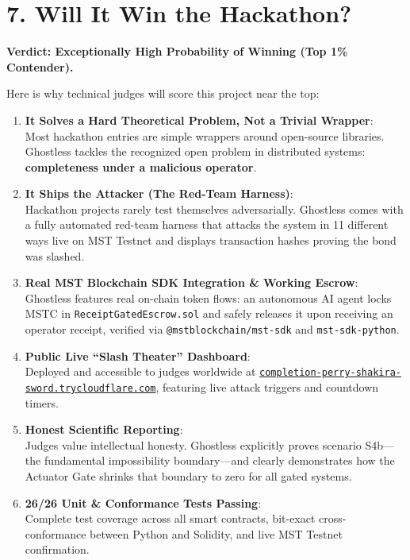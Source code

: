 \documentclass[11pt,a4paper]{article}
\begin{document}
\section{7. Will It Win the Hackathon?}

\textbf{Verdict: Exceptionally High Probability of Winning (Top 1\% Contender).}

Here is why technical judges will score this project near the top:

\begin{enumerate}[leftmargin=1.5em]
    \item \textbf{It Solves a Hard Theoretical Problem, Not a Trivial Wrapper}:\\
    Most hackathon entries are simple wrappers around open-source libraries. Ghostless tackles the recognized open problem in distributed systems: \textbf{completeness under a malicious operator}.
    \item \textbf{It Ships the Attacker (The Red-Team Harness)}:\\
    Hackathon projects rarely test themselves adversarially. Ghostless comes with a fully automated red-team harness that attacks the system in 11 different ways live on MST Testnet and displays transaction hashes proving the bond was slashed.
    \item \textbf{Real MST Blockchain SDK Integration \& Working Escrow}:\\
    Ghostless features real on-chain token flows: an autonomous AI agent locks MSTC in \texttt{ReceiptGatedEscrow.sol} and safely releases it upon receiving an operator receipt, verified via \texttt{@mstblockchain/mst-sdk} and \texttt{mst-sdk-python}.
    \item \textbf{Public Live ``Slash Theater'' Dashboard}:\\
    Deployed and accessible to judges worldwide at \href{https://completion-perry-shakira-sword.trycloudflare.com}{\texttt{completion-perry-shakira-sword.trycloudflare.com}}, featuring live attack triggers and countdown timers.
    \item \textbf{Honest Scientific Reporting}:\\
    Judges value intellectual honesty. Ghostless explicitly proves scenario S4b—the fundamental impossibility boundary—and clearly demonstrates how the Actuator Gate shrinks that boundary to zero for all gated systems.
    \item \textbf{26/26 Unit \& Conformance Tests Passing}:\\
    Complete test coverage across all smart contracts, bit-exact cross-conformance between Python and Solidity, and live MST Testnet confirmation.
\end{enumerate}
\end{document}
